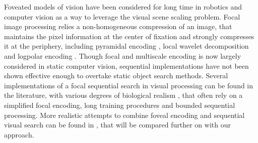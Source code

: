 Foveated models of vision have been considered for long time in robotics and computer vision as a way to leverage the visual scene scaling problem. Focal image processing relies a non-homogeneous compression of an image, that maintains the pixel information at the center of fixation and strongly compresses it at the periphery, including pyramidal encoding \citep{kortum1996implementation,Butko2010infomax}, local wavelet decomposition \citep{dauce2018active} and logpolar encoding \citep{fischer2007self,Traver10}. Though focal and multiscale encoding is now largely considered in static computer vision, sequential implementations have not been shown effective enough to overtake static object search methods. Several implementations of a focal sequential search in visual processing can be found in the literature, with various degrees of biological realism \citep{mnih2014recurrent,fu2017look}, that often rely on a simplified focal encoding, long training procedures and bounded sequential processing. More realistic attempts to combine foveal encoding and sequential visual search can be found in \citep{Butko2010infomax,denil2012learning,dauce2018active}, that will be compared further on with our approach.


